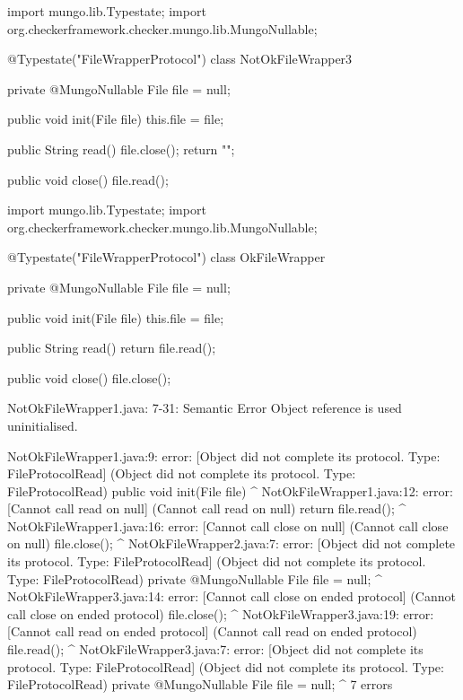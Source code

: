 \begin{code}
import mungo.lib.Typestate;
import org.checkerframework.checker.mungo.lib.MungoNullable;

@Typestate("FileWrapperProtocol")
class NotOkFileWrapper3 {

  private @MungoNullable File file = null;

  public void init(File file) {
    this.file = file;
  }

  public String read() {
    file.close();
    return "";
  }

  public void close() {
    file.read();
  }

}\end{code}

\begin{code}
import mungo.lib.Typestate;
import org.checkerframework.checker.mungo.lib.MungoNullable;

@Typestate("FileWrapperProtocol")
class OkFileWrapper {

  private @MungoNullable File file = null;

  public void init(File file) {
    this.file = file;
  }

  public String read() {
    return file.read();
  }

  public void close() {
    file.close();
  }

}\end{code}

\lstset{caption=Original Mungo output}
\begin{code}

NotOkFileWrapper1.java: 7-31: Semantic Error
		Object reference is used uninitialised.
\end{code}

\lstset{caption=New Mungo output}
\begin{code}
NotOkFileWrapper1.java:9: error: [Object did not complete its protocol. Type: FileProtocol{Read}] (Object did not complete its protocol. Type: FileProtocol{Read})
  public void init(File file) {}
                        ^
NotOkFileWrapper1.java:12: error: [Cannot call read on null] (Cannot call read on null)
    return file.read();
                    ^
NotOkFileWrapper1.java:16: error: [Cannot call close on null] (Cannot call close on null)
    file.close();
              ^
NotOkFileWrapper2.java:7: error: [Object did not complete its protocol. Type: FileProtocol{Read}] (Object did not complete its protocol. Type: FileProtocol{Read})
  private @MungoNullable File file = null;
                              ^
NotOkFileWrapper3.java:14: error: [Cannot call close on ended protocol] (Cannot call close on ended protocol)
    file.close();
              ^
NotOkFileWrapper3.java:19: error: [Cannot call read on ended protocol] (Cannot call read on ended protocol)
    file.read();
             ^
NotOkFileWrapper3.java:7: error: [Object did not complete its protocol. Type: FileProtocol{Read}] (Object did not complete its protocol. Type: FileProtocol{Read})
  private @MungoNullable File file = null;
                              ^
7 errors
\end{code}

